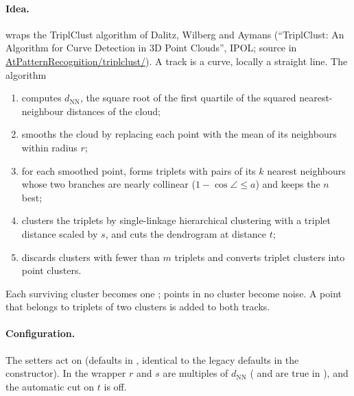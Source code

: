 \paragraph{Idea.}  wraps the TriplClust algorithm of Dalitz, Wilberg and Aymans
(``TriplClust: An Algorithm for Curve Detection in 3D Point Clouds'', IPOL; source in
\url{AtPatternRecognition/triplclust/}). A track is a curve, locally a straight line. The algorithm
\begin{enumerate}
\item computes $d_\mathrm{NN}$, the square root of the first quartile of the squared nearest-neighbour
  distances of the cloud;
\item smooths the cloud by replacing each point with the mean of its neighbours within radius $r$;
\item for each smoothed point, forms triplets with pairs of its $k$ nearest neighbours whose two branches
  are nearly collinear ($1-\cos\angle \le a$) and keeps the $n$ best;
\item clusters the triplets by single-linkage hierarchical clustering with a triplet distance scaled by $s$,
  and cuts the dendrogram at distance $t$;
\item discards clusters with fewer than $m$ triplets and converts triplet clusters into point clusters.
\end{enumerate}
Each surviving cluster becomes one ; points in no cluster become noise. A point that belongs
to triplets of two clusters is added to both tracks.

\paragraph{Configuration.} The setters act on  (defaults in
, identical to the legacy defaults in the  constructor). In the
wrapper $r$ and $s$ are multiples of $d_\mathrm{NN}$ ( and  are true in
), and the automatic cut on $t$ is off.

